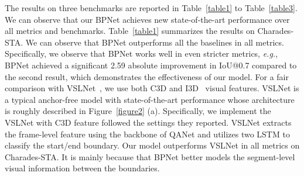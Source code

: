 \documentclass[letterpaper]{article} %
\newcommand{\eg}{\emph{e.g.}}
\begin{document}
The results on three benchmarks are reported in Table~\ref{table1} to Table~\ref{table3}. We can observe that our BPNet achieves new state-of-the-art performance over all metrics and benchmarks.
Table~\ref{table1} summarizes the results on Charades-STA.
We can observe that BPNet outperforms all the baselines
in all metrics.
Specifically, we observe that BPNet works well in even stricter metrics,
\eg, BPNet achieved a significant 2.59 absolute improvement in IoU@0.7
compared to the second result, which demonstrates the effectiveness of
our model.
For a fair comparison with VSLNet~\cite{DBLP:conf/acl/ZhangSJZ20}, we use both C3D and I3D~\cite{DBLP:conf/cvpr/CarreiraZ17} visual features.
VSLNet is a typical anchor-free model with state-of-the-art performance
whose architecture is roughly described in Figure~\ref{figure2} (a).
Specifically, we implement the VSLNet with C3D feature followed the settings they reported.
VSLNet extracts the frame-level feature using the backbone of QANet and utilizes two
LSTM to classify the start/end boundary.
Our model outperforms VSLNet in all metrics on Charades-STA. It is mainly because that
BPNet better models the segment-level visual information between the boundaries.
\end{document}
